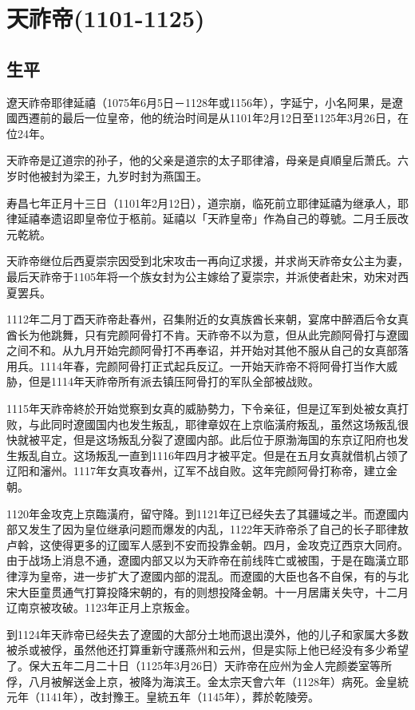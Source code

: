 
\section{天祚帝\tiny(1101-1125)}

\subsection{生平}

遼天祚帝耶律延禧（1075年6月5日－1128年或1156年），字延宁，小名阿果，是遼國西遷前的最后一位皇帝，他的统治时间是从1101年2月12日至1125年3月26日，在位24年。

天祚帝是辽道宗的孙子，他的父亲是道宗的太子耶律濬，母亲是貞順皇后萧氏。六岁时他被封为梁王，九岁时封为燕国王。

寿昌七年正月十三日（1101年2月12日），道宗崩，临死前立耶律延禧为继承人，耶律延禧奉遗诏即皇帝位于柩前。延禧以「天祚皇帝」作為自己的尊號。二月壬辰改元乾統。

天祚帝继位后西夏崇宗因受到北宋攻击一再向辽求援，并求尚天祚帝女公主为妻，最后天祚帝于1105年将一个族女封为公主嫁给了夏崇宗，并派使者赴宋，劝宋对西夏罢兵。

1112年二月丁酉天祚帝赴春州，召集附近的女真族酋长来朝，宴席中醉酒后令女真酋长为他跳舞，只有完颜阿骨打不肯。天祚帝不以为意，但从此完颜阿骨打与遼國之间不和。从九月开始完颜阿骨打不再奉诏，并开始对其他不服从自己的女真部落用兵。1114年春，完颜阿骨打正式起兵反辽。一开始天祚帝不将阿骨打当作大威胁，但是1114年天祚帝所有派去镇压阿骨打的军队全部被战败。

1115年天祚帝終於开始觉察到女真的威胁勢力，下令亲征，但是辽军到处被女真打败，与此同时遼國国内也发生叛乱，耶律章奴在上京临潢府叛乱，虽然这场叛乱很快就被平定，但是这场叛乱分裂了遼國内部。此后位于原渤海国的东京辽阳府也发生叛乱自立。这场叛乱一直到1116年四月才被平定。但是在五月女真就借机占领了辽阳和瀋州。1117年女真攻春州，辽军不战自败。这年完颜阿骨打称帝，建立金朝。

1120年金攻克上京臨潢府，留守降。到1121年辽已经失去了其疆域之半。而遼國内部又发生了因为皇位继承问题而爆发的内乱，1122年天祚帝杀了自己的长子耶律敖卢斡，这使得更多的辽國军人感到不安而投靠金朝。四月，金攻克辽西京大同府。由于战场上消息不通，遼國内部又以为天祚帝在前线阵亡或被围，于是在臨潢立耶律淳为皇帝，进一步扩大了遼國内部的混乱。而遼國的大臣也各不自保，有的与北宋大臣童贯通气打算投降宋朝的，有的则想投降金朝。十一月居庸关失守，十二月辽南京被攻破。1123年正月上京叛金。

到1124年天祚帝已经失去了遼國的大部分土地而退出漠外，他的儿子和家属大多数被杀或被俘，虽然他还打算重新守護燕州和云州，但是实际上他已经没有多少希望了。保大五年二月二十日（1125年3月26日）天祚帝在应州为金人完颜娄室等所俘，八月被解送金上京，被降为海滨王。金太宗天會六年（1128年）病死。金皇統元年（1141年），改封豫王。皇統五年（1145年），葬於乾陵旁。


